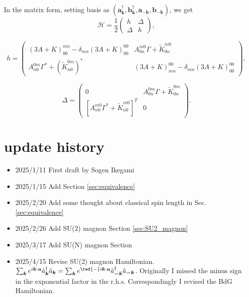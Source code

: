 \documentclass[11pt, aps, longbibliography]{article}
\begin{document}
\begin{tcolorbox}
    In the matrix form, setting basis as $\left( \mathbf{a}_{\bm{k}}^\dagger, \mathbf{b}_{\bm{k}}^\dagger, \mathbf{a}_{-\bm{k}}, \mathbf{b}_{-\bm{k}} \right)$, we get 
\begin{equation}
    \mathcal{H} = \frac{1}{2}\begin{pmatrix}
        h & \Delta \\ \Delta & h
    \end{pmatrix},
\end{equation}

\begin{equation}
    h = \begin{pmatrix}
        \left( 3A+K \right)^{mn}_{00}-\delta_{mn}\left( 3A+K \right)^{00}_{00} & A^{m0}_{0n}\Gamma + \tilde{K}^{m0}_{0n} \\
        A^{0m}_{n0}\Gamma^* + (\tilde{K}^{0m}_{n0})^* & \left(   3A+K \right)^{00}_{mn}-\delta_{mn}\left( 3A+K \right)^{00}_{00}
    \end{pmatrix},
\end{equation}

\begin{equation}
    \Delta = \begin{pmatrix}
        0 & A^{0m}_{0n}\Gamma + \tilde{K}^{0m}_{0n} \\ [A^{m0}_{n0}\Gamma^* + \tilde{K}^{m0}_{n0}]^T & 0
    \end{pmatrix}.
\end{equation}
\end{tcolorbox}

\newpage

\section*{update history}
\begin{itemize}
    \item 2025/1/11 First draft by Sogen Ikegami
    \item 2025/1/15 Add Section \ref{sec:equivalence} 
    \item 2025/2/20 Add some thought about classical spin length in Sec.\ref{sec:equivalence} 
    \item 2025/2/26 Add SU(2) magnon Section \ref{sec:SU2_magnon}
    \item 2025/3/17 Add SU(N) magnon Section
    \item 2025/4/15 Revise SU(2) magnon Hamiltonian. $\sum_{\bm{k}}e^{i\bm{k}\cdot \bm{a}}\hat{a}^\dagger_{\bm{k}} \hat{a}_{\bm{k}} = \sum_{\bm{k}}e^{\red{-}i\bm{k}\cdot \bm{a}}\hat{a}^\dagger_{\bm{-k}} \hat{a}_{\bm{-k}}$. Originally I missed the minus sign in the exponential factor in the r.h.s.
        Correspondingly I revised the BdG Hamiltonian.
\end{itemize}

\newpage 

\printbibliography
%
%
\end{document}

